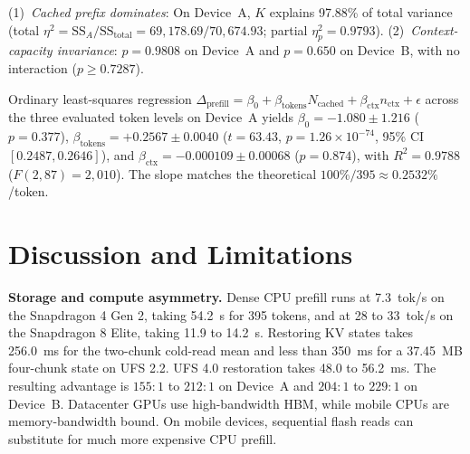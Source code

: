 \documentclass[10pt,conference]{IEEEtran}
\begin{document}
\begin{table}[!htbp]
\centering
\caption{Two-way ANOVA on prefill reduction (df: 2, 2, 4; residual df 81 on A with $\mathrm{SS}_{\text{res}}=1{,}458.82$, and 36 on B). $\eta_p^2$ denotes partial eta-squared.}
\label{tab:anova}
\scriptsize
\setlength{\tabcolsep}{2.5pt}
\renewcommand{\arraystretch}{0.98}
\end{table}

(1)~\emph{Cached prefix dominates}: On Device~A, $K$ explains 97.88\% of total variance (total $\eta^2 = \mathrm{SS}_A/\mathrm{SS}_{\text{total}}=69{,}178.69/70{,}674.93$; partial $\eta_p^2=0.9793$).
(2)~\emph{Context-capacity invariance}: $p=0.9808$ on Device~A and $p=0.650$ on Device~B, with no interaction ($p\ge0.7287$).

Ordinary least-squares regression $\Delta_{\text{prefill}}=\beta_0+\beta_{\text{tokens}}N_{\text{cached}}+\beta_{\text{ctx}}n_{\text{ctx}}+\epsilon$ across the three evaluated token levels on Device~A yields $\beta_0=-1.080\pm1.216$ ($p=0.377$), $\beta_{\text{tokens}}=+0.2567\pm0.0040$ ($t=63.43$, $p=1.26\times10^{-74}$, 95\% CI $[0.2487,0.2646]$), and $\beta_{\text{ctx}}=-0.000109\pm0.00068$ ($p=0.874$), with $R^2=0.9788$ ($F(2,87)=2{,}010$). The slope matches the theoretical $100\%/395\approx0.2532\%$/token.

\section{Discussion and Limitations}
\label{sec:discussion}
\textbf{Storage and compute asymmetry.} Dense CPU prefill runs at 7.3~tok/s on the Snapdragon 4 Gen 2, taking 54.2~s for 395 tokens, and at 28 to 33~tok/s on the Snapdragon 8 Elite, taking 11.9 to 14.2~s. Restoring KV states takes 256.0~ms for the two-chunk cold-read mean and less than 350~ms for a 37.45~MB four-chunk state on UFS 2.2. UFS 4.0 restoration takes 48.0 to 56.2~ms. The resulting advantage is $155{:}1$ to $212{:}1$ on Device~A and $204{:}1$ to $229{:}1$ on Device~B. Datacenter GPUs use high-bandwidth HBM, while mobile CPUs are memory-bandwidth bound. On mobile devices, sequential flash reads can substitute for much more expensive CPU prefill.
\end{document}
